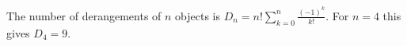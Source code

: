 The number of derangements of $n$ objects is $D_{n} = n!\sum_{k=0}^{n} \frac{(-1)^{k}}{k!}$.
For $n = 4$ this gives $D_{4} = 9$.